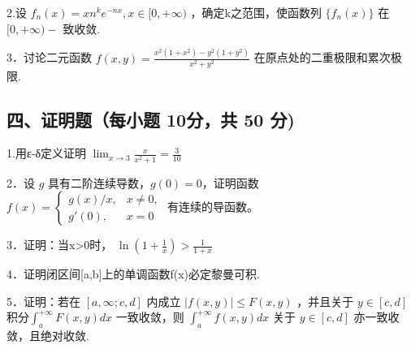 \documentclass[11pt,fontset=fandol]{ctexart}
\begin{document}
2.设
\(f _ { n } ( x ) = x n ^ { k } e ^ { - n x } , x \in [ 0 , + \infty )\)
，确定k之范围，使函数列 \(\{ f _ { n } ( x ) \}\) 在
\([ 0 , + \infty ) -\) 致收敛.

3．讨论二元函数
\(f ( x , y ) = { \frac { x ^ { 2 } ( 1 + x ^ { 2 } ) - y ^ { 2 } ( 1 + y ^ { 2 } ) } { x ^ { 2 } + y ^ { 2 } } }\)
在原点处的二重极限和累次极限.

\subsection{四、证明题（每小题 10分，共 50
分)}\label{ux56dbux8bc1ux660eux9898ux6bcfux5c0fux9898-10ux5206ux5171-50-ux5206}

1.用ε-δ定义证明
\(\lim _ { x \to 3 } { \frac { x } { x ^ { 2 } + 1 } } = { \frac { 3 } { 1 0 } }\)

2．设 \(g\) 具有二阶连续导数，\(g(0)=0\)，证明函数
\(f(x)=\begin{cases}g(x)/x,&x\neq0,\\g'(0),&x=0\end{cases}\)
有连续的导函数。

3．证明：当x\textgreater0时，
\(\ln ( 1 + { \frac { 1 } { x } } ) > { \frac { 1 } { 1 + x } }\)

4．证明闭区间{[}a,b{]}上的单调函数f(x)必定黎曼可积.

5．证明：若在 \([ a , \infty ; c , d ]\) 内成立
\(\left| f ( x , y ) \right| \leq F ( x , y )\) ，并且关于
\(y \in [ c , d ]\) 积分\(\int _ { a } ^ { + \infty } F ( x , y ) d x\)
一致收敛，则 \(\int _ { a } ^ { + \infty } f ( x , y ) d x\) 关于
\(y \in [ c , d ]\) 亦一致收敛，且绝对收敛.
\end{document}
